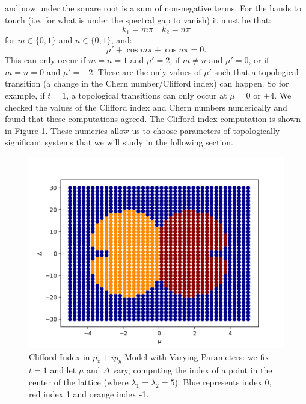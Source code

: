 \documentclass[a4paper]{article}
\begin{document}
and now under the square root is a sum of non-negative terms. For the bands to touch (i.e. for what is under the spectral gap to vanish) it must be that:
\begin{equation}
	k_1 = m \pi \quad k_2 = n \pi
\end{equation}
for $m \in \{0,1\}$ and $n \in \{0,1\}$, and:
\begin{equation}
	\mu' + \cos m \pi + \cos n \pi = 0.
\end{equation}
This can only occur if $m = n = 1$ and $\mu' = 2$, if $m \neq n$ and $\mu' = 0$, or if $m = n = 0$ and $\mu' = - 2$.
These are the only values of $\mu'$ such that a topological transition (a change in the Chern number/Clifford index) can happen.
So for example, if $t = 1$, a topological transitions can only occur at $\mu = 0$ or $\pm 4$.
We checked the values of the Clifford index and Chern numbers numerically and found that these computations agreed. The Clifford index computation is shown in Figure \ref{fig:pxipy_params}. These numerics allow us to choose parameters of topologically significant systems that we will study in the following section.

\begin{figure}
\centering
\includegraphics[width=.9\textwidth]{figures/pxipy_index_by_param.png}
\caption{Clifford Index in $p_x + ip_y$ Model with Varying Parameters: we fix $t = 1$ and let $\mu$ and $\Delta$ vary, computing the index of a point in the center of the lattice (where $\lambda_1 = \lambda_2 = 5$).
Blue represents index 0, red index 1 and orange index -1.
}
\label{fig:pxipy_params}%
\end{figure}
\end{document}
